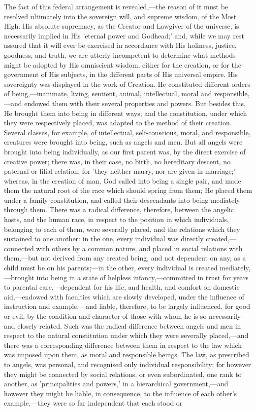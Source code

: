 \documentclass[
]{book}
\begin{document}
The fact of this federal arrangement is revealed,---the reason of it must be resolved ultimately into the sovereign will, and supreme wisdom, of the Most High. His absolute supremacy, as the Creator and Lawgiver of the universe, is necessarily implied in His 'eternal power and Godhead;' and, while we may rest assured that it will ever be exercised in accordance with His holiness, justice, goodness, and truth, we are utterly incompetent to determine what methods might be adopted by His omniscient wisdom, either for the creation, or for the government of His subjects, in the different parts of His universal empire. His sovereignty was displayed in the work of Creation. He constituted different orders of being,---inanimate, living, sentient, animal, intellectual, moral and responsible,---and endowed them with their several properties and powers. But besides this, He brought them into being in different ways; and the constitution, under which they were respectively placed, was adapted to the method of their creation. Several classes, for example, of intellectual, self-conscious, moral, and responsible, creatures were brought into being, such as angels and men. But all angels were brought into being individually, as our first parent was, by the direct exercise of creative power; there was, in their case, no birth, no hereditary descent, no paternal or filial relation, for 'they neither marry, nor are given in marriage;' whereas, in the creation of man, God called into being a single pair, and made them the natural root of the race which should spring from them; He placed them under a family constitution, and called their descendants into being mediately through them. There was a radical difference, therefore, between the angelic hosts, and the human race, in respect to the position in which individuals, belonging to each of them, were severally placed, and the relations which they sustained to one another: in the one, every individual was directly created,---connected with others by a common nature, and placed in social relations with them,---but not derived from any created being, and not dependent on any, as a child must be on his parents;---in the other, every individual is created mediately,---brought into being in a state of helpless infancy,---committed in trust for years to parental care,---dependent for his life, and health, and comfort on domestic aid,---endowed with faculties which are slowly developed, under the influence of instruction and example,---and liable, therefore, to be largely influenced, for good or evil, by the condition and character of those with whom he is so necessarily and closely related. Such was the radical difference between angels and men in respect to the natural constitution under which they were severally placed,---and there was a corresponding difference between them in respect to the law which was imposed upon them, as moral and responsible beings. The law, as prescribed to angels, was personal, and recognised only individual responsibility; for however they might be connected by social relations, or even subordinated, one rank to another, as 'principalities and powers,' in a hierarchical government,---and however they might be liable, in consequence, to the influence of each other's example,---they were so far independent that each stood or 
\end{document}
